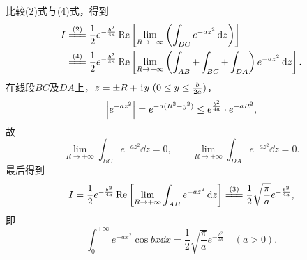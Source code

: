 \begin{example}
\begin{solution}
比较(2)式与(4)式，得到\[
\begin{split}
I &\xlongequal{\rm(2)} \frac{1}{2} e^{-\frac{b^2}{4a}} \Re\left[\lim_{R\to+\infty} \left( \int_{DC} e^{-az^2} \dd{z} \right)\right] \\
&\xlongequal{\rm(4)} \frac{1}{2} e^{-\frac{b^2}{4a}} \Re\left[\lim_{R\to+\infty} \left( \int_{AB} + \int_{BC} + \int_{DA}\right) e^{-az^2} \dd{z}\right].
\end{split}
\]
在线段\(BC\)及\(DA\)上，\(z=\pm R+\kern1pt\mathrm{i}\kern1pt y\ (0 \leq y \leq \frac{b}{2a})\)，\[
\abs{e^{-az^2}}
= e^{-a(R^2-y^2)}
\leq e^{\frac{b^2}{4a}} \cdot e^{-aR^2},
\]故\[
\lim_{R\to+\infty} \int_{BC} e^{-az^2} \dd{z} = 0,
\qquad
\lim_{R\to+\infty} \int_{DA} e^{-az^2} \dd{z} = 0.
\]最后得到\[
I = \frac{1}{2} e^{-\frac{b^2}{4a}} \Re\left[ \lim_{R\to+\infty} \int_{AB} e^{-az^2} \dd{z} \right]
\xlongequal{\rm(3)} \frac{1}{2} \sqrt{\frac{\pi}{a}} e^{-\frac{b^2}{4a}},
\]即\begin{equation}\label{equation:留数定理.泊松积分}
\int_0^{+\infty} e^{-ax^2} \cos bx \dd{x}
= \frac{1}{2} \sqrt{\frac{\pi}{a}} e^{-\frac{b^2}{4a}}
\quad(a>0).
\end{equation}
\end{solution}
\end{example}

